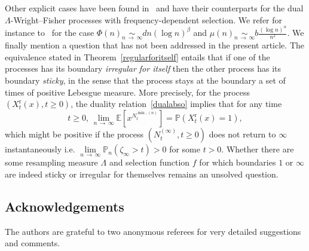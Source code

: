 \documentclass[10pt]{amsart}
\theoremstyle{definition}\newtheorem{defi}[theo]{Definition}\newtheorem{rema}[theo]{Remark}\newtheorem{exam}[theo]{Example}\newtheorem{exem}[theo]{Example}\newtheorem{nota}[theo]{Notation}
\newcommand{\rmr}{\mathrm{r}}
\newcommand{\bbE}{\mathbb{E}}
\newcommand{\bbP}{\mathbb{P}}
\begin{document}
Other explicit cases have been found in~\cite{explosion} and have their counterparts for the dual $\Lambda$-Wright--Fisher processes with frequency-dependent selection. We refer for instance to~\cite[Theorem~3.11]{explosion} for the case $\Phi(n)\underset{n\,\rightarrow\,\infty}{\sim} d n(\log n)^{\beta}$ and $\mu(n)\underset{n\,\rightarrow\,\infty}{\sim} b \frac{(\log n)^{\alpha}}{n^2}$. We finally mention a question that has not been addressed in the present article. The equivalence stated in Theorem~\ref{regularforitself} entails that if one of the processes has its boundary \emph{irregular for itself} then the other process has its boundary \emph{sticky}, in the sense that the process stays at the boundary a set of times of positive Lebesgue measure. More precisely, for the process $(X_t^{\rmr}(x),t\geq 0)$, the duality relation~\eqref{dualabso} implies that for any time 
\[
t\geq 0,\,\underset{n\,\rightarrow\,\infty}{\lim}\bbE\left[x^{N_t^{\min,(n)}}\right]=\bbP\left(X_t^{\rmr}(x)=1\right),
\]
which might be positive if the process $(N^{(\infty)}_t,t\geq 0)$ does not return to $\infty$ instantaneously i.e. $\underset{n\,\rightarrow\,\infty}{\lim}\bbP_n(\zeta_\infty> t)>0$ for some $t>0$. Whether there are some resampling measure $\Lambda$ and selection function $f$ for which boundaries $1$ or $\infty$ are indeed sticky or irregular for themselves remains an unsolved question. 

\subsection*{Acknowledgements}
The authors are grateful to two anonymous referees for very detailed suggestions and comments.
\end{document}
